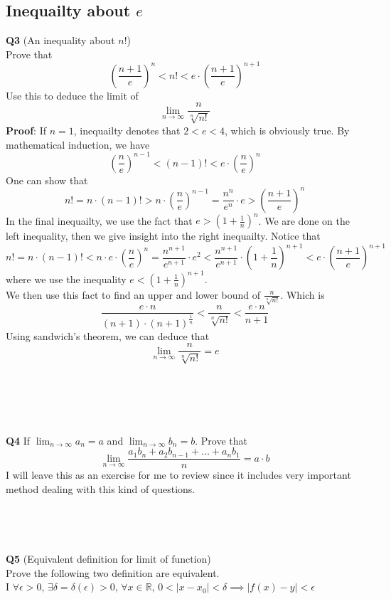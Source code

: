 \documentclass{article}
\begin{document}
\subsection{Inequailty about $e$}
\textbf{Q3} (An inequality about $n!$)\\
Prove that 
$$
\left (\frac{n+1}{e} \right )^{n} < n! < e \cdot \left (\frac{n+1}{e}\right )^{n+1}
$$
Use this to deduce the limit of
$$
\lim_{n \to \infty} \frac{n}{\sqrt[n]{n!}}
$$
\textbf{Proof}: If $n = 1$, inequailty denotes that $2< e <4$, which is obviously true. By mathematical induction, we have
$$
\left (\frac{n}{e} \right )^{n-1} < (n-1)! < e\cdot \left (\frac{n}{e} \right )^n
$$
One can show that
$$
n! = n \cdot (n-1)! > n \cdot \left( \frac{n}{e} \right) ^ {n-1} = \frac{n^n}{e^n} \cdot e > \left(\frac{n+1}{e}\right) ^n
$$
In the final inequailty, we use the fact that $e > \left(1+\frac{1}{n}\right)^n$. We are done on the left inequality, then we give insight into the right inequailty.
Notice that 
$$
n! = n \cdot (n-1)! < n \cdot e \cdot \left(\frac{n}{e}\right)^n = \frac{n^{n+1}}{e^{n+1}} \cdot e^2 < \frac{n^{n+1}}{e^{n+1}} \cdot \left(1+\frac{1}{n}\right)^{n+1} < e \cdot \left(\frac{n+1}{e}\right)^{n+1}
$$
where we use the inequality $e < \left( 1 + \frac{1}{n}\right)^{n+1}$.\\
We then use this fact to find an upper and lower bound of $\frac{n}{\sqrt[n]{n!}}$. Which is
$$
\frac{e \cdot n}{ \left ( n+1 \right ) \cdot \left(n+1\right)^{\frac{1}{n}}} < \frac{n}{\sqrt[n]{n!}} < \frac{e \cdot n}{n+1}
$$
Using sandwich's theorem, we can deduce that
$$
\lim_{n \to \infty} \frac{n}{\sqrt[n]{n!}} = e
$$\\
\\
\\
\\
\\
\textbf{Q4} If $\lim_{n \to \infty} a_n = a$ and $\lim_{n \to \infty} b_n = b$. Prove that 
$$
\lim_{n \to \infty} \frac{a_1 b_n + a_2 b_{n-1} + \dots + a_n b_1}{n} = a \cdot b
$$
I will leave this as an exercise for me to review since it includes very important method dealing with this kind of questions.\\
\\
\\
\\
\\
\textbf{Q5} (Equivalent definition for limit of function)\\
Prove the following two definition are equivalent.\\
I $\forall \epsilon > 0$, $\exists \delta = \delta(\epsilon) > 0$, $\forall x \in \mathbb{R}$, $0<\left| x - x_0 \right|<\delta \implies \left| f(x) - y \right| < \epsilon$\\
\end{document}
